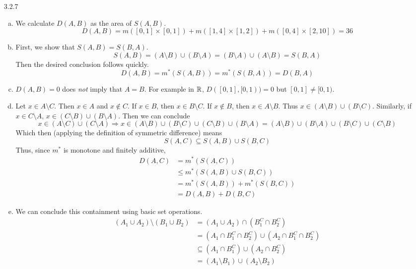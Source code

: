 \documentclass[../../Solutions.tex]{subfiles}
\begin{document}
\begin{itemize}
	\item [3.2.7]
	\begin{enumerate}[(a)]
		\item %
			We calculate $D(A,B)$ as the area of $S(A,B)$.
			$$ D(A,B) = m([0,1]\times[0,1])+m([1,4]\times[1,2])+m([0,4]\times[2,10]) = 36 $$
		\item First, we show that $S(A,B) = S(B,A)$.
			$$ S(A,B) = (A\setminus B)\cup(B\setminus A) = (B\setminus A)\cup(A\setminus B) = S(B,A) $$
			Then the desired conclusion follows quickly.
			$$ D(A,B) = m^*(S(A,B)) = m^*(S(B,A)) = D(B,A) $$
		\item $D(A,B) = 0$ does \emph{not} imply that $A = B$. For example in $\mathbb{R}$, $D([0,1],[0,1)) = 0$ but $[0,1] \neq [0,1)$.
		\item Let $x \in A\setminus C$.
			Then $x \in A$ and $x \not\in C$.
			If $x \in B$, then $x \in B\setminus C$.
			If $x \not\in B$, then $x \in A\setminus B$.
			Thus $x \in (A\setminus B)\cup(B\setminus C)$.
			Similarly, if $x \in C\setminus A$, $x \in (C\setminus B)\cup(B\setminus A)$.
			Then we can conclude
			$$ x \in (A\setminus C)\cup(C\setminus A) \Longrightarrow x \in (A\setminus B)\cup(B\setminus C)\cup(C\setminus B)\cup(B\setminus A) = (A\setminus B)\cup(B\setminus A)\cup(B\setminus C)\cup(C\setminus B) $$
			Which then (applying the definition of symmetric difference) means
			$$ S(A,C) \subseteq S(A,B)\cup S(B,C) $$
			Thus, since $m^*$ is monotone and finitely additive,
			\begin{equation*} \begin{split}
				D(A,C) & = m^*(S(A,C)) \\
					& \leq m^*(S(A,B)\cup S(B,C)) \\
					& = m^*(S(A,B))+m^*(S(B,C)) \\
					& = D(A,B)+D(B,C)
			\end{split} \end{equation*}
		\item We can conclude this containment using basic set operations.
			\begin{equation*} \begin{split}
				(A_1 \cup A_2)\setminus(B_1\cup B_2) & = (A_1\cup A_2)\cap(B_1^C\cap B_2^C) \\
					& = (A_1\cap B_1^C \cap B_2^C)\cup(A_2\cap B_1^C\cap B_2^C) \\
					& \subseteq (A_1 \cap B_1^C)\cup(A_2\cap B_2^C) \\
					& = (A_1\setminus B_1)\cup(A_2\setminus B_2)
			\end{split} \end{equation*}

\end{enumerate}
\end{itemize}
\end{document}
